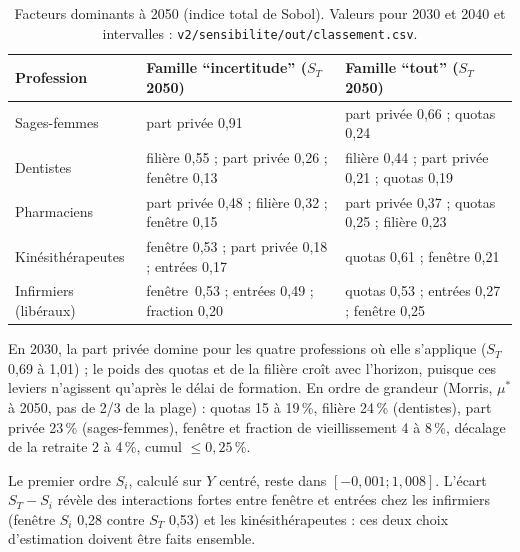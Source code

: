 \begin{table}[h]\centering\small
\begin{tabular}{p{2.9cm}p{5.8cm}p{5.8cm}}
\toprule
Profession & Famille \enquote{incertitude} ($S_T$ 2050) & Famille \enquote{tout} ($S_T$ 2050) \\
\midrule
Sages-femmes & part privée 0,91\mesure{} & part privée 0,66\mesure{} ; quotas 0,24\mesure{} \\
Dentistes & filière 0,55\mesure{} ; part privée 0,26\mesure{} ; fenêtre 0,13\mesure{} & filière 0,44\mesure{} ; part privée 0,21\mesure{} ; quotas 0,19\mesure{} \\
Pharmaciens & part privée 0,48\mesure{} ; filière 0,32\mesure{} ; fenêtre 0,15\mesure{} & part privée 0,37\mesure{} ; quotas 0,25\mesure{} ; filière 0,23\mesure{} \\
Kinésithérapeutes & fenêtre 0,53\mesure{} ; part privée 0,18\mesure{} ; entrées 0,17\mesure{} & quotas 0,61\mesure{} ; fenêtre 0,21\mesure{} \\
Infirmiers (libéraux) & fenêtre~0,53\mesure{} ; entrées 0,49\mesure{} ; fraction 0,20\mesure{} & quotas 0,53\mesure{} ; entrées 0,27\mesure{} ; fenêtre 0,25\mesure{} \\
\bottomrule
\end{tabular}
\caption{Facteurs dominants à 2050 (indice total de Sobol). Valeurs pour 2030 et 2040 et intervalles :
\texttt{v2/sensibilite/out/classement.csv}.}\label{a5-tab:st}
\end{table}

En 2030, la part privée domine pour les quatre professions où elle s'applique ($S_T$ 0,69 à 1,01\mesure{}) ; le
poids des quotas et de la filière croît avec l'horizon, puisque ces leviers n'agissent qu'après le délai de
formation. En ordre de grandeur (Morris, $\mu^*$ à 2050, pas de 2/3 de la plage) : quotas 15 à 19\,\%\mesure{},
filière 24\,\%\mesure{} (dentistes), part privée 23\,\%\mesure{} (sages-femmes), fenêtre et fraction de
vieillissement 4 à 8\,\%\mesure{}, décalage de la retraite 2 à 4\,\%\mesure{}, cumul $\le 0{,}25$\,\%\mesure{}.

Le premier ordre $S_i$, calculé sur $Y$ centré, reste dans $[-0{,}001 ; 1{,}008]$\mesure{}. L'écart
$S_T - S_i$ révèle des interactions fortes entre fenêtre et entrées chez les infirmiers (fenêtre $S_i$ 0,28 contre
$S_T$ 0,53\mesure{}) et les kinésithérapeutes : ces deux choix d'estimation doivent être faits ensemble.

